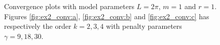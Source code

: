\begin{figure}
    \caption{ Convergence plots with model parameters $L=2\pi$, $m=1$ and $r=1$. Figures \ref{fig:ex2_conv:a}, \ref{fig:ex2_conv:b} and \ref{fig:ex2_conv:c} has respectively the order $k=2,3, 4$ with penalty parameters $\gamma = 9,18,30 $.  }
    \label{fig:ex2_conv}
\end{figure}



